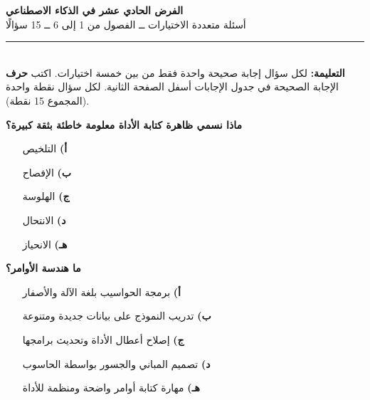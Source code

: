 \documentclass[11pt,a4paper]{article}
\begin{document}
\begin{center}
{\Large\khatt\textbf{الفرض الحادي عشر في الذكاء الاصطناعي}}\\[2pt]
{\normalsize أسئلة متعددة الاختيارات ــ الفصول من 1 إلى 6 ــ 15 سؤالًا}
\end{center}
\vspace{-4pt}\rule{\textwidth}{0.6pt}\\
{\small\textbf{التعليمة:} لكل سؤال إجابة صحيحة واحدة فقط من بين خمسة اختيارات.
اكتب \textbf{حرف} الإجابة الصحيحة في جدول الإجابات أسفل الصفحة الثانية.
لكل سؤال نقطة واحدة (المجموع 15 نقطة).}
\vspace{-2pt}
\begin{multicols}{2}

\noindent\begin{minipage}{\linewidth}
\hangindent=0.7cm\textbf{ماذا نسمي ظاهرة كتابة الأداة معلومة خاطئة بثقة كبيرة؟}
\begin{itemize}[leftmargin=0.95cm, labelsep=4pt, itemsep=0pt, topsep=2pt, parsep=0pt]
  \item[\textbf{أ)}] التلخيص
  \item[\textbf{ب)}] الإفصاح
  \item[\textbf{ج)}] الهلوسة
  \item[\textbf{د)}] الانتحال
  \item[\textbf{هـ)}] الانحياز
\end{itemize}
\end{minipage}\par\vspace{7pt plus 4pt}
\noindent\begin{minipage}{\linewidth}
\hangindent=0.7cm\textbf{ما هندسة الأوامر؟}
\begin{itemize}[leftmargin=0.95cm, labelsep=4pt, itemsep=0pt, topsep=2pt, parsep=0pt]
  \item[\textbf{أ)}] برمجة الحواسيب بلغة الآلة والأصفار
  \item[\textbf{ب)}] تدريب النموذج على بيانات جديدة ومتنوعة
  \item[\textbf{ج)}] إصلاح أعطال الأداة وتحديث برامجها
  \item[\textbf{د)}] تصميم المباني والجسور بواسطة الحاسوب
  \item[\textbf{هـ)}] مهارة كتابة أوامر واضحة ومنظمة للأداة
\end{itemize}
\end{minipage}\par\vspace{7pt plus 4pt}

\end{multicols}
\end{document}

